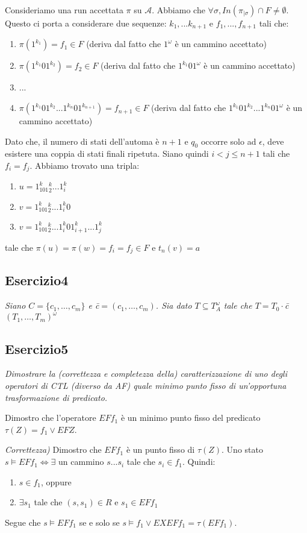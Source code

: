 \documentclass[12pt]{article}
\newcommand{\A}{\ensuremath{\mathcal{A}}\xspace}
\begin{document}
Consideriamo una run accettata $\pi$ su $\A$. Abbiamo che $\forall \sigma, In(\pi_{|\sigma}) \cap F \neq \emptyset$. Questo ci porta a considerare due sequenze: $k_1,...k_{n+1}$ e $f_1,...,f_{n+1}$ tali che:
\begin{enumerate}
\item $\pi(1^{k_1}) = f_1 \in F$ (deriva dal fatto che $1^\omega$ è un cammino accettato)
\item $\pi(1^{k_1}01^{k_2}) = f_2 \in F$ (deriva dal fatto che $1^{k_1}01^\omega$ è un cammino accettato)
\item ...
\item $\pi(1^{k_1}01^{k_2}...1^{k_n}01^{k_{n+1}}) = f_{n+1} \in F$ (deriva dal fatto che $1^{k_1}01^{k_2}...1^{k_n}01^\omega$ è un cammino accettato)
\end{enumerate}

Dato che, il numero di stati dell'automa è $n+1$ e $q_0$ occorre solo ad $\epsilon$, deve esistere una coppia di stati finali ripetuta. Siano quindi $i<j\leq n+1$ tali che $f_i=f_j$. Abbiamo trovato una tripla:
\begin{enumerate}
\item $u=1^k_101^k_2...1^k_i$
\item $v=1^k_101^k_2...1^k_i0$
\item $v=1^k_101^k_2...1^k_i01^k_{i+1}...1^k_j$
\end{enumerate} 
tale che $\pi(u)=\pi(w)=f_i=f_j \in F$ e $t_n(v)=a$ 

\subsection*{Esercizio4}
\textit{Siano $C=\{c_1,\ldots,c_m\}$ e \=c$= ( c_1,\ldots,c_m) $. Sia dato $T \subseteq T^{\omega}_A$ tale che $T=T_0 \cdot$\=c$(T_1,\ldots,T_m)^{\omega}$}


\subsection*{Esercizio5}
\textit{Dimostrare la (correttezza e completezza della) caratterizzazione di uno degli operatori di CTL (diverso da AF) quale minimo punto fisso di un'opportuna trasformazione di predicato.}

Dimostro che l'operatore $EF f_1$ è un minimo punto fisso del predicato $\tau(Z)=f_1 \lor EFZ$.

\medskip

\textit{Correttezza)} Dimostro che $EF f_1$ è un punto fisso di $\tau(Z)$.
Uno stato $s \models EF f_1 \Leftrightarrow \exists $ un cammino $s...s_i$ tale che $s_i \in f_1$. Quindi:
\begin{enumerate}[noitemsep]
\item $s \in f_1$, oppure
\item $\exists s_1$ tale che $(s,s_1) \in R$ e $s_1 \in EF f_1$
\end{enumerate}
Segue che $s \models EF f_1$ se e solo se $s \models f_1 \lor EXEF f_1 = \tau(EF f_1)$.
\end{document}
